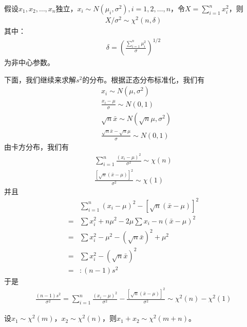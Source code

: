         \begin{corollary}[卡方分布的一般形式3]
        假设$x_1,x_2,\dots,x_n$独立，$x_i\sim N(\mu_i,\sigma^2),i = 1,2,\dots,n$，令$X = \sum_{i= 1}^nx_i^2$，则
        \begin{align*}
        X/\sigma^2 \sim \chi^2(n,\delta)
        \end{align*}
        其中：
        \begin{align*}
        \delta = \left( \frac{\sum_{i = 1}^n \mu_i^2 }{\sigma}\right)^{1/2}
        \end{align*}
         为非中心参数。
        \end{corollary}
        \par
        下面，我们继续来求解$s^2$的分布。根据正态分布标准化，我们有
        \begin{align*}
        &x_i \sim N(\mu,\sigma^2)\\
        &\frac{x_i - \mu}{\sigma}\sim N(0,1)\\
        &\sqrt{n}\bar{x}\sim N(\sqrt{n}\mu,\sigma^2)\\
        &\frac{\sqrt{n}\bar{x} - \sqrt{n}\mu}{\sigma} \sim N(0,1)
        \end{align*}
        由卡方分布，我们有
        \begin{align*}
        \sum_{i = 1}^n \frac{(x_i - \mu)^2}{\sigma^2}\sim \chi(n)\\
        \frac{[\sqrt{n}(\bar{x}-\mu)]^2}{\sigma^2} \sim \chi(1)
        \end{align*}
        并且
        \begin{align*}
        &\sum_{i = 1}^n (x_i - \mu)^2 - [\sqrt{n}(\bar{x}-\mu)]^2\\
        =&\sum x_i^2+n\mu^2 -2\mu \sum x_i - n(\bar{x}-\mu)^2\\
        =&\sum x_i^2 - \mu^2 - (\sqrt{n}\bar{x})^2+\mu^2\\
        =&\sum x_i^2- (\sqrt{n}\bar{x})^2\\
        =&: (n-1)s^2
        \end{align*}
        于是
        \begin{align*}
        \frac{(n-1)s^2}{\sigma^2} = \sum_{i = 1}^n \frac{(x_i - \mu)^2}{\sigma^2}- \frac{[\sqrt{n}(\bar{x}-\mu)]^2}{\sigma^2}\sim \chi^2 (n) - \chi^2(1)
        \end{align*}
        \begin{lemma}[卡方分布的可加性]
        设$x_1\sim \chi^2(m)$，$x_2\sim \chi^2(n)$，则$x_1+x_2 \sim \chi^2(m+n)$。
        \end{lemma}
